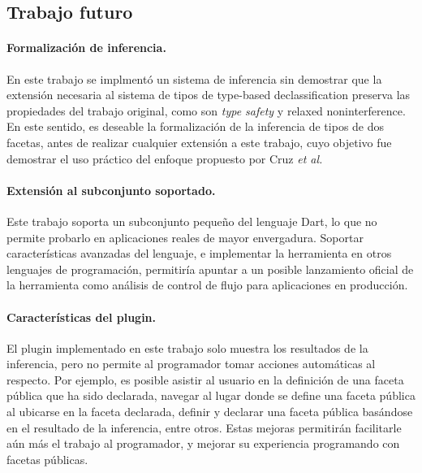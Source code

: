 \begin{conclusion}


	\section*{Trabajo futuro}

	\paragraph{Formalización de inferencia.}En este trabajo se implmentó un sistema de inferencia sin demostrar que la extensión necesaria al sistema de tipos de type-based declassification preserva las propiedades del trabajo original, como son \emph{type safety} y relaxed noninterference. En este sentido, es deseable la formalización de la inferencia de tipos de dos facetas, antes de realizar cualquier extensión a este trabajo, cuyo objetivo fue demostrar el uso práctico del enfoque propuesto por Cruz \textit{et al.}

	\paragraph{Extensión al subconjunto soportado.}Este trabajo soporta un subconjunto pequeño del lenguaje Dart, lo que no permite probarlo en aplicaciones reales de mayor envergadura. Soportar características avanzadas del lenguaje, e implementar la herramienta en otros lenguajes de programación, permitiría apuntar a un posible lanzamiento oficial de la herramienta como análisis de control de flujo para aplicaciones en producción.

	\paragraph{Características del plugin.}El plugin implementado en este trabajo solo muestra los resultados de la inferencia, pero no permite al programador tomar acciones automáticas al respecto. Por ejemplo, es posible asistir al usuario en la definición de una faceta pública que ha sido declarada, navegar al lugar donde se define una faceta pública al ubicarse en la faceta declarada, definir y declarar una faceta pública basándose en el resultado de la inferencia, entre otros. Estas mejoras permitirán facilitarle aún más el trabajo al programador, y mejorar su experiencia programando con facetas públicas.



\end{conclusion}

